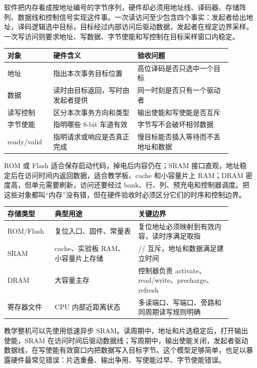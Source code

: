 软件把内存看成按地址编号的字节序列，硬件却必须用地址线、译码器、存储阵列、数据线和控制信号实现这件事。一次读访问至少包含四个事实：发起者给出地址，译码逻辑选中目标，目标经过内部访问后驱动数据，发起者在规定边界采样。一次写访问则要求地址、写数据、字节使能和写控制在目标采样窗口内稳定。

\begin{longtable}{L{0.18\linewidth}L{0.34\linewidth}L{0.38\linewidth}}
\toprule
对象 & 硬件含义 & 验收问题 \\
\midrule
地址 & 指出本次事务目标位置 & 高位译码是否只选中一个目标 \\
数据 & 读时由目标返回，写时由发起者提供 & 同一时刻是否只有一个驱动者 \\
读写控制 & 区分本次事务方向和类型 & 输出使能和写使能是否互斥 \\
字节使能 & 指明哪些 8-bit 车道有效 & 字节写不会破坏相邻数据 \\
ready/valid & 指明请求或响应是否真正完成 & 慢目标能否插入等待而不丢地址和数据 \\
\bottomrule
\end{longtable}

ROM 或 Flash 适合保存启动代码，掉电后内容仍在；SRAM 接口直观，地址稳定后在访问时间内返回数据，适合教学板、cache 和小容量片上 RAM；DRAM 密度高，但单元需要刷新，访问还要经过 bank、行、列、预充电和控制器调度。把这些对象都叫“内存”没有错，但在硬件验收时必须区分它们的时序和控制边界。

\begin{longtable}{L{0.18\linewidth}L{0.34\linewidth}L{0.38\linewidth}}
\toprule
存储类型 & 典型用途 & 关键边界 \\
\midrule
ROM/Flash & 复位入口、固件、常量表 & 复位地址必须映射到有效内容，读时序满足取指 \\
SRAM & cache、实验板 RAM、小容量片上存储 & // 互斥，地址和数据满足建立时间 \\
DRAM & 大容量主存 & 控制器负责 activate、read/write、precharge、refresh \\
寄存器文件 & CPU 内部近距离状态 & 多读端口、写端口、旁路和同周期读写规则明确 \\
\bottomrule
\end{longtable}

教学整机可以先使用低速异步 SRAM。读周期中，地址和片选稳定后，打开输出使能，SRAM 在访问时间后驱动数据线；写周期中，输出使能关闭，发起者驱动数据线，在写使能有效窗口内把数据写入目标字节。这个模型足够简单，也足以暴露硬件最常见错误：片选重叠、输出争用、写使能过早、字节使能错误。

